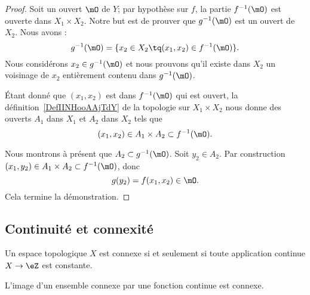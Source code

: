 \begin{proof}
    Soit un ouvert \( \mO\) de \( Y\); par hypothèse sur \( f\), la partie \( f^{-1}(\mO)\) est ouverte dans \( X_1\times X_2\). Notre but est de prouver que \( g^{-1}(\mO)\) est un ouvert de \( X_2\). Nous avons :
    \begin{equation}
        g^{-1}(\mO)=\{ x_2\in X_2\tq (x_1,x_2)\in f^{-1}(\mO) \}.
    \end{equation}
    Nous considérons \( x_2\in g^{-1}(\mO)\) et nous prouvons qu'il existe dans \( X_2\) un voisinage de \( x_2\) entièrement contenu dans \( g^{-1}(\mO)\).

    Étant donné que \( (x_1,x_2)\) est dans \( f^{-1}(\mO)\) qui est ouvert, la définition~\ref{DefIINHooAAjTdY} de la topologie sur \( X_1\times X_2\) nous donne des ouverts \( A_1\) dans \( X_1\) et \( A_2\) dans \( X_2\) tels que
    \begin{equation}
        (x_1,x_2)\in A_1\times A_2\subset f^{-1}(\mO).
    \end{equation}

    Nous montrons à présent que \( A_2\subset g^{-1}(\mO)\). Soit \( y_2\in A_2\). Par construction \( (x_1,y_2)\in A_1\times A_2\subset f^{-1}(\mO)\), donc
    \begin{equation}
        g(y_2)=f(x_1,x_2)\in \mO.
    \end{equation}
    Cela termine la démonstration.
\end{proof}

\subsection{Continuité et connexité}


\begin{proposition} \label{PropConnexiteViaFonction}
  Un espace topologique \( X \) est connexe si et seulement si toute application continue \( X\to \eZ\) est constante.
\end{proposition}

\begin{proposition}\label{PropGWMVzqb}
    L'image d'un ensemble connexe par une fonction continue est connexe.
\end{proposition}


